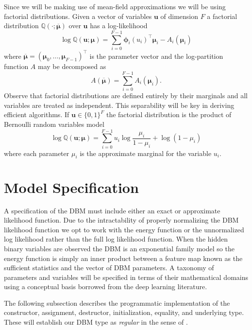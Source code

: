 \documentclass{article} %
\begin{document}
Since we will be making use of mean-field approximations we will be
using factorial distributions.  Given a vector of variables
$\mathbf{u}$ of dimension $F$ a factorial distribution $\mathbb{Q}(\cdot;\overline{\boldsymbol{\mu}})$ over $\mathbf{u}$ has a log-likelihood
\begin{equation}
\log \mathbb{Q}(\mathbf{u};\boldsymbol{\mu}) = \sum_{i=0}^{F-1} \boldsymbol{\phi}_i(u_i)^\top \boldsymbol{\mu}_i - A_i(\boldsymbol{\mu}_i)
\end{equation}
where $\overline{\boldsymbol{\mu}}=(\boldsymbol{\mu}_0,\ldots,\boldsymbol{\mu}_{F-1})^\top$ is the parameter vector and
the log-partition function $A$ may be decomposed as
\begin{equation}
A(\overline{\boldsymbol{\mu}}) = \sum_{i=0}^{F-1} A_i(\boldsymbol{\mu}_i).
\end{equation}
Observe that factorial distributions are defined entirely by their
marginals and all variables are treated as independent.  This
separability will be key in deriving efficient algorithms.  If
$\mathbf{u}\in \{0,1\}^F$ the factorial distribution is the product of Bernoulli random variables model
\begin{equation}
\log \mathbb{Q}(\mathbf{u};\boldsymbol{\mu}) = \sum_{i=0}^{F-1} u_i\log\frac{\mu_i}{1-\mu_i} + \log(1-\mu_i)
\end{equation}
where each parameter $\mu_i$ is the approximate marginal for the variable $u_i$.



\section{Model Specification}

A specification of the DBM must include either an exact or approximate likelihood function.  Due to the intractability of properly
normalizing the DBM likelihood function we opt to work with the energy function or the unnormalized log likelihood rather than the full log likelihood
function. When the hidden binary variables are observed the DBM is an exponential family model so the energy function is simply an inner product between a feature map known as the sufficient statistics and the vector of DBM parameters.
  A taxonomy of parameters and variables will be specified in terms of their mathematical domains using a conceptual basis borrowed from
the deep learning literature.

The following subsection describes the programmatic implementation of the constructor, assignment, destructor, initialization, equality,
and underlying type.  These will establish our DBM type as { \it regular} in the sense of \cite[Chapter~1]{stepanov2009elements}.
\end{document}
